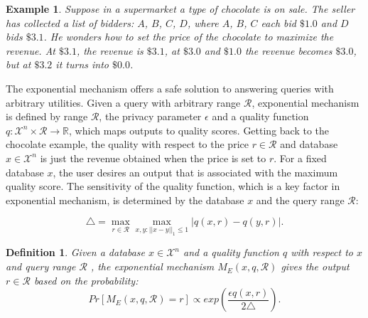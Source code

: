 \documentclass[a4paper, 11pt]{article} %
\newtheorem{definition}{Definition}[section]
\newtheorem{example}{Example}[section]
\begin{document}
\begin{example}
Suppose in a supermarket a type of chocolate is on sale. The seller has collected a list of bidders: $A$, $B$, $C$, $D$, where $A$, $B$, $C$ each bid $\$1.0$ and $D$ bids $\$3.1$. He wonders how to set the price of the chocolate to maximize the revenue. At $\$3.1$, the revenue is $\$3.1$, at $\$3.0$ and $\$1.0$ the revenue becomes $\$3.0$, but at $\$3.2$ it turns into $\$0.0$.
\end{example}

The exponential mechanism offers a safe solution to answering queries with arbitrary utilities. Given a query with arbitrary range $\mathcal{R}$, exponential mechanism is defined by range $\mathcal{R}$, the privacy parameter $\epsilon$ and a quality function $q:\mathcal{X}^n \times \mathcal{R} \rightarrow \mathbb{R}$, which maps outputs to quality scores. Getting back to the chocolate example, the quality with respect to the price $r\in \mathcal{R}$ and database $x \in  \mathcal{X}^n $ is just the revenue obtained when the price is set to $r$. For a fixed database $x$, the user desires an output that is associated with the maximum quality score. The sensitivity of the quality function, which is a key factor in exponential mechanism, is determined by the database $x$ and the query range $\mathcal{R}$:

\begin{equation}
\triangle = \max_{r \in \mathcal{R}} \max_{x,y:||x-y||_1 \leq 1} |q(x, r)-q(y,r)|.
\end{equation}

\begin{definition}
Given a database $x \in  \mathcal{X}^n$ and a quality function $q$ with respect to $x$ and query range $\mathcal{R}$ , the exponential mechanism $M_E(x, q, \mathcal{R})$ gives the output $r \in \mathcal{R}$ based on the probability:
$$Pr[M_E(x, q, \mathcal{R}) = r] \propto exp(\frac{\epsilon q(x, r)}{2\triangle}).$$
\end{definition}
\end{document}
